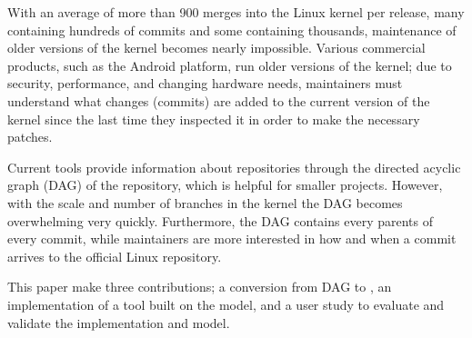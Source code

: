 

With an average of more than 900 merges into the Linux kernel per
release, many containing hundreds of commits and some containing
thousands, maintenance of older versions of the kernel becomes nearly
impossible. Various commercial products, such as the Android platform,
run older versions of the kernel; due to security, performance, and
changing hardware needs, maintainers must understand what changes
(commits) are added to the current version of the kernel since the last
time they inspected it in order to make the necessary patches.

Current tools provide information about repositories through the
directed acyclic graph (DAG) of the repository, which is helpful for
smaller projects. However, with the scale and number of branches in the
kernel the DAG becomes overwhelming very quickly. Furthermore, the DAG
contains every parents of every commit, while maintainers are more
interested in how and when a commit arrives to the official Linux
repository.

This paper make three contributions; a conversion from DAG to \mt, an
implementation of a tool built on the \mt model, and a user study to
evaluate and validate the implementation and model.

